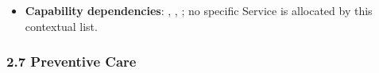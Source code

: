 \begin{itemize}
\begin{itemize}
\begin{itemize}
\item 
\emph{Exposed Service}: \texttt{} — Exposes active allergy profiles to clinical decision support systems.



\end{itemize}


\end{itemize}


\item 
\textbf{Capability dependencies}: \texttt{}, \texttt{}, \texttt{}; no specific Service is allocated by this contextual list.



\end{itemize}
\label{rad:sd:159}

\par\smallskip
{}\label{rad:sd:161}



\label{rad:sd:163}
\subsubsection*{2.7 Preventive Care}
\label{rad:sd:164}

